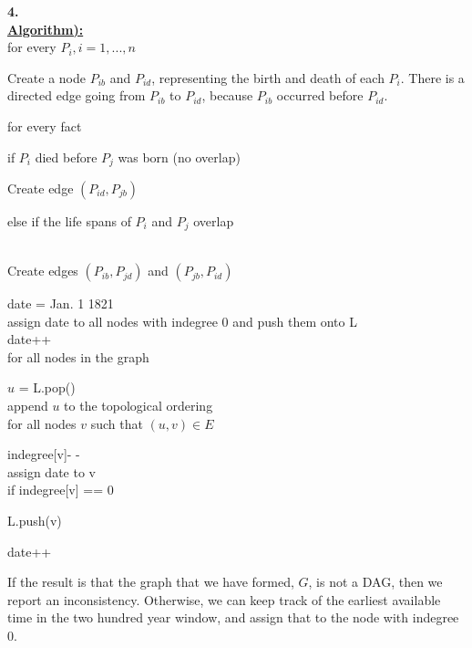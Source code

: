\documentclass[10pt, letterpaper]{report}
\begin{document}
\newpage
\noindent \large{\textbf{4.} }\\
\textbf{\underline{Algorithm):}}\\
for every $P_i, i = 1,...,n$\\
\begin{adjustwidth}{1em}{0pt}
Create a node $P_{ib}$ and $P_{id}$, representing the birth and death of each $P_i$. There is a directed edge going from $P_{ib}$ to $P_{id}$, because $P_{ib}$ occurred before $P_{id}$.\\
\end{adjustwidth}
for every fact \\ 
\begin{adjustwidth}{1em}{0pt}
if $P_i$ died before $P_j$ was born (no overlap)\\
\begin{adjustwidth}{2em}{0pt}
Create edge $(P_{id}, P_{jb})$\\
\end{adjustwidth}
else if the life spans of $P_i$ and $P_j$ overlap\\\
\begin{adjustwidth}{2em}{0pt}
Create edges $(P_{ib}, P_{jd})$ and $(P_{jb}, P_{id})$\\
\end{adjustwidth}
\end{adjustwidth}
date = Jan. 1 1821\\
assign date to all nodes with indegree 0 and push them onto L\\
date++\\
for all nodes in the graph\\
\begin{adjustwidth}{1em}{0pt}
$u$ = L.pop()\\
append $u$ to the topological ordering\\
for all nodes $v$ such that $(u,v) \in E$\\
\begin{adjustwidth}{2em}{0pt}
indegree[v]- -\\
assign date to v\\
if indegree[v] == 0\\
\begin{adjustwidth}{3em}{0pt}
L.push(v)\\
\end{adjustwidth}
\end{adjustwidth}
date++\\
\end{adjustwidth}
If the result is that the graph that we have formed, $G$, is not a DAG, then we report an inconsistency. Otherwise, we can keep track of the earliest available time in the two hundred year window, and assign that to the node with indegree 0.\\
\end{document}
